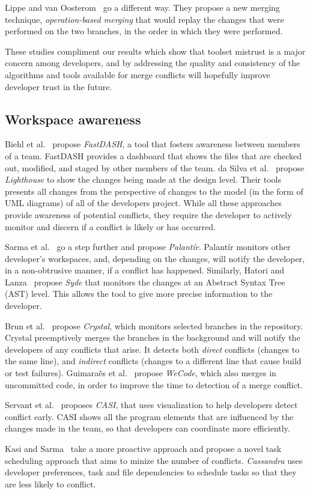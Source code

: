Lippe and van Oosterom~\cite{lippe_operation-based_1992} go a different way.
They propose a new merging technique, \emph{operation-based merging} that would replay the changes that were performed on the two branches, in the order in which they were performed.

These studies compliment our results which show that toolset mistrust is a major concern among developers, and by addressing the quality and consistency of the algorithms and tools available for merge conflicts will hopefully improve developer trust in the future.

\subsection{Workspace awareness} 

Biehl et al.~\cite{biehl_fastdash:_2007} propose \emph{FastDASH}, a tool that fosters awareness between members of a team. 
FastDASH provides a dashboard that shows the files that are checked out, modified, and staged by other members of the team.
da Silva et al.~\cite{da_silva_lighthouse:_2006} propose \emph{Lighthouse} to show the changes being made at the design level.
Their tools presents all changes from the perspective of changes to the model (in the form of UML diagrams) of all of the developers project.
While all these approaches provide awareness of potential conflicts, they require the developer to actively monitor and discern if a conflict is likely or has occurred.

Sarma et al.~\cite{palantir, sarma_palantir:_2003} go a step further and propose \emph{Palant\'{i}r}.
Palant\'{i}r monitors other developer's workspaces, and, depending on the changes, will notify the developer, in a non-obtrusive manner, if a conflict has happened.
Similarly, Hatori and Lanza~\cite{hattori2010syde} propose \emph{Syde} that monitors the changes at an Abstract Syntax Tree (AST) level.
This allows the tool to give more precise information to the developer.

Brun et al.~\cite{Brun2011} propose \emph{Crystal}, which monitors selected branches in the repository. 
Crystal preemptively merges the branches in the background and will notify the developers of any conflicts that arise. 
It detects both \emph{direct} conflicts (changes to the same line), and \emph{indirect} conflicts (changes to a different line that cause build or test failures).
Guimara\~{e}s et al.~\cite{Guimaraes} propose \emph{WeCode}, which also merges in uncommitted code, in order to improve the time to detection of a merge conflict.

Servant et al.~\cite{servant_casi:_2010} proposes \emph{CASI}, that uses visualization to help developers detect conflict early.
CASI shows all the program elements that are influenced by the changes made in the team, so that developers can coordinate more efficiently.

Kasi and Sarma~\cite{kasi_cassandra:_2013} take a more proactive approach and propose a novel task scheduling approach that aims to minize the number of conflicts. 
\emph{Cassandra} uses developer preferences, task and file dependencies to schedule tasks so that they are less likely to conflict.
